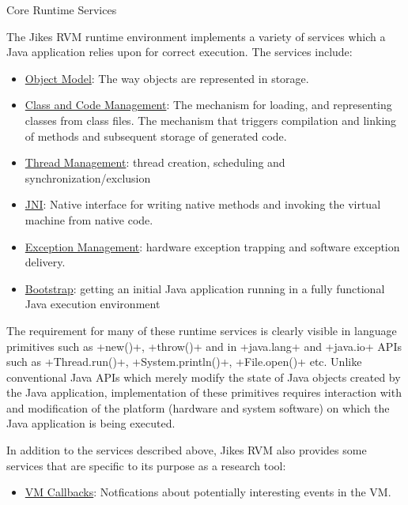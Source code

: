 \begin{section}{Core Runtime Services}
\label{sec:coreruntimeservices}

The Jikes RVM runtime environment implements a variety of services which a Java application relies upon for correct execution. The services include:

\begin{itemize}
  \item \hyperref[sec:objectmodel]{Object Model}: The way objects are represented in storage.
  \item \hyperref[sec:classandcodemanagement]{Class and Code Management}: The mechanism for loading, and representing classes from class files. The mechanism that triggers compilation and linking of methods and subsequent storage of generated code.
  \item \hyperref[sec:threadmanagement]{Thread Management}: thread creation, scheduling and synchronization/exclusion
  \item \hyperref[sec:jni]{JNI}: Native interface for writing native methods and invoking the virtual machine from native code.
  \item \hyperref[sec:exceptionmanagement]{Exception Management}: hardware exception trapping and software exception delivery.
  \item \hyperref[sec:bootstrap]{Bootstrap}: getting an initial Java application running in a fully functional Java execution environment
\end{itemize}

The requirement for many of these runtime services is clearly visible in language primitives such as \spverb+new()+, \spverb+throw()+ and in \spverb+java.lang+ and \spverb+java.io+ APIs such as \spverb+Thread.run()+, \spverb+System.println()+, \spverb+File.open()+ etc. Unlike conventional Java APIs which merely modify the state of Java objects created by the Java application, implementation of these primitives requires interaction with and modification of the platform (hardware and system software) on which the Java application is being executed.

In addition to the services described above, Jikes RVM also provides some services that are specific to its purpose as 
a research tool:
\begin{itemize}
  \item \hyperref[sec:vmcallbacks]{VM Callbacks}: Notfications about potentially interesting events in the VM.
\end{itemize}

\end{section}
